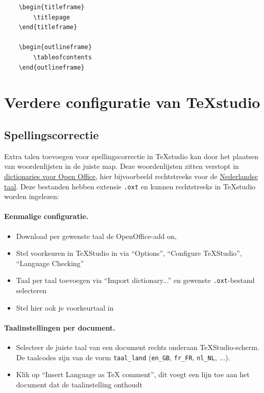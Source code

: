 \documentclass[kulak]{kulakarticle} %
\begin{document}
\begin{verbatim}
	\begin{titleframe}
		\titlepage
	\end{titleframe}
	
	\begin{outlineframe}
		\tableofcontents
	\end{outlineframe}
\end{verbatim}

\section{Verdere configuratie van TeXstudio}
\label{sec:texstudio}
\subsection{Spellingscorrectie}
Extra talen toevoegen voor spellingscorrectie in TeXstudio kan door het plaatsen van woordenlijsten in de juiste map. Deze woordenlijsten zitten verstopt in \href{https://extensions.openoffice.org/}{dictionaries voor Open Office}, hier bijvoorbeeld rechtstreeks voor de \href{http://extensions.openoffice.org/en/project/dutch-spelling-and-hyphenation-dictionary}{Nederlandse taal}. Deze bestanden hebben extensie \texttt{.oxt} en kunnen rechtstreeks in TeXstudio worden ingelezen:

\paragraph{Eenmalige configuratie.}
\begin{itemize}
	\item Download per gewenste taal de OpenOffice-add on,
	\item Stel voorkeuren in TeXStudio in via ``Options'', ``Configure TeXStudio'', ``Language Checking''
	\item Taal per taal toevoegen via ``Import dictionary...'' en gewenste \texttt{.oxt}-bestand selecteren
	\item Stel hier ook je voorkeurtaal in
\end{itemize}

\paragraph{Taalinstellingen per document.}
\begin{itemize}
	\item Selecteer de juiste taal van een document rechts onderaan TeXStudio-scherm. De taalcodes zijn van de vorm \texttt{taal\_land} (\texttt{en\_GB}, \texttt{fr\_FR}, \texttt{nl\_NL}, ...).
	\item Klik op ``Insert Language as TeX comment'', dit voegt een lijn toe aan het document dat de taalinstelling onthoudt
\end{itemize}
\end{document}
